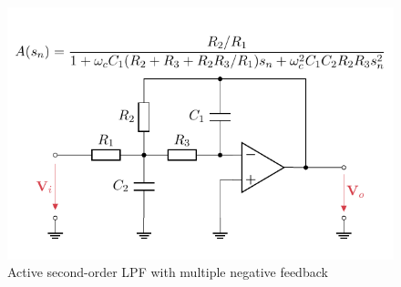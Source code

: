 \begin{figure}[!htb]
  \centering
  \includegraphics[scale=0.95]{figures/electronics/lowpass/lp_active_2ord_neg/lp_active_2ord_neg}
  \caption[Active Second-Order \ac{LPF} With Multiple Negative Feedback]{Active second-order \ac{LPF} with multiple negative feedback%
    \label{fig:lp_active_2ord_neg}}
\end{figure}
